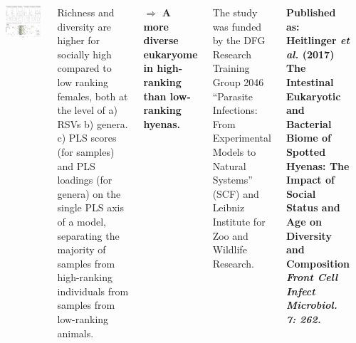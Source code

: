 \documentclass[30pt, a0paper, portrait, margin=0mm, innermargin=15mm,
               blockverticalspace=15mm, colspace=15mm, subcolspace=8mm]{tikzposter}
\begin{document}
\begin{columns}
 {
  \begin{minipage}{0.7\linewidth}                  
    \includegraphics[scale=0.67]{Figure4_man.png}
  \end{minipage}
  \hfill
  \begin{minipage}{0.3\linewidth}
     Richness and diversity are higher for socially
    high compared to low ranking females, both at the level of a) RSVs
    b) genera.  c) PLS scores (for samples) and PLS loadings (for
    genera) on the single PLS axis of a model, separating the majority
    of samples from high-ranking individuals from samples from
    low-ranking animals.
  \end{minipage}
  $\Rightarrow$ \textbf{A more diverse eukaryome in high-ranking than
    low-ranking hyenas.} }


{

  The study was funded by the DFG Research Training Group 2046
  ``Parasite Infections: From Experimental Models to Natural Systems''
  (SCF) and Leibniz Institute for Zoo and Wildlife Research.

  \textbf{Published as:
  \hangindent=2cm  Heitlinger \textit{et al.} (2017) The
    Intestinal Eukaryotic and Bacterial Biome of Spotted Hyenas:
    The Impact of Social Status and Age on Diversity and
    Composition \textit{Front Cell Infect Microbiol. 7: 262.}}
}

      {
        \begin{small}


\end{small}}
\end{columns}
\end{document}
